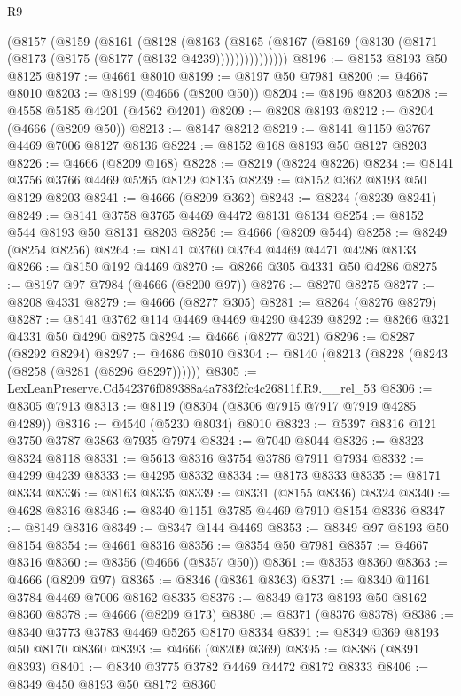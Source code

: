\begin{lexlean}{R9}
\begin{coremodule}
      (@8157
        (@8159
          (@8161
            (@8128
              (@8163
                (@8165 (@8167 (@8169 (@8130 (@8171 (@8173 (@8175 (@8177 (@8132 @4239)))))))))))))))
@8196 := @8153 @8193 @50 @8125
@8197 := @4661 @8010
@8199 := @8197 @50 @7981
@8200 := @4667 @8010
@8203 := @8199 (@4666 (@8200 @50))
@8204 := @8196 @8203
@8208 := @4558 @5185 @4201 (@4562 @4201)
@8209 := @8208 @8193
@8212 := @8204 (@4666 (@8209 @50))
@8213 := @8147 @8212
@8219 := @8141 @1159 @3767 @4469 @7006 @8127 @8136
@8224 := @8152 @168 @8193 @50 @8127 @8203
@8226 := @4666 (@8209 @168)
@8228 := @8219 (@8224 @8226)
@8234 := @8141 @3756 @3766 @4469 @5265 @8129 @8135
@8239 := @8152 @362 @8193 @50 @8129 @8203
@8241 := @4666 (@8209 @362)
@8243 := @8234 (@8239 @8241)
@8249 := @8141 @3758 @3765 @4469 @4472 @8131 @8134
@8254 := @8152 @544 @8193 @50 @8131 @8203
@8256 := @4666 (@8209 @544)
@8258 := @8249 (@8254 @8256)
@8264 := @8141 @3760 @3764 @4469 @4471 @4286 @8133
@8266 := @8150 @192 @4469
@8270 := @8266 @305 @4331 @50 @4286
@8275 := @8197 @97 @7984 (@4666 (@8200 @97))
@8276 := @8270 @8275
@8277 := @8208 @4331
@8279 := @4666 (@8277 @305)
@8281 := @8264 (@8276 @8279)
@8287 := @8141 @3762 @114 @4469 @4469 @4290 @4239
@8292 := @8266 @321 @4331 @50 @4290 @8275
@8294 := @4666 (@8277 @321)
@8296 := @8287 (@8292 @8294)
@8297 := @4686 @8010
@8304 := @8140 (@8213 (@8228 (@8243 (@8258 (@8281 (@8296 @8297))))))
@8305 := LexLeanPreserve.Cd542376f089388a4a783f2fc4c26811f.R9.__rel_53
@8306 := @8305 @7913
@8313 := @8119 (@8304 (@8306 @7915 @7917 @7919 @4285 @4289))
@8316 := @4540 (@5230 @8034) @8010
@8323 := @5397 @8316 @121 @3750 @3787 @3863 @7935 @7974
@8324 := @7040 @8044
@8326 := @8323 @8324 @8118
@8331 := @5613 @8316 @3754 @3786 @7911 @7934
@8332 := @4299 @4239
@8333 := @4295 @8332
@8334 := @8173 @8333
@8335 := @8171 @8334
@8336 := @8163 @8335
@8339 := @8331 (@8155 @8336) @8324
@8340 := @4628 @8316
@8346 := @8340 @1151 @3785 @4469 @7910 @8154 @8336
@8347 := @8149 @8316
@8349 := @8347 @144 @4469
@8353 := @8349 @97 @8193 @50 @8154
@8354 := @4661 @8316
@8356 := @8354 @50 @7981
@8357 := @4667 @8316
@8360 := @8356 (@4666 (@8357 @50))
@8361 := @8353 @8360
@8363 := @4666 (@8209 @97)
@8365 := @8346 (@8361 @8363)
@8371 := @8340 @1161 @3784 @4469 @7006 @8162 @8335
@8376 := @8349 @173 @8193 @50 @8162 @8360
@8378 := @4666 (@8209 @173)
@8380 := @8371 (@8376 @8378)
@8386 := @8340 @3773 @3783 @4469 @5265 @8170 @8334
@8391 := @8349 @369 @8193 @50 @8170 @8360
@8393 := @4666 (@8209 @369)
@8395 := @8386 (@8391 @8393)
@8401 := @8340 @3775 @3782 @4469 @4472 @8172 @8333
@8406 := @8349 @450 @8193 @50 @8172 @8360

\end{coremodule}
\end{lexlean}
